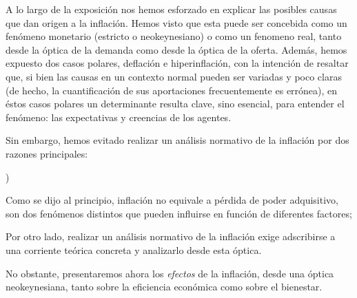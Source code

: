 \documentclass[10pt,a4paper]{article}
\newcounter{alphaitem}
\newenvironment{la}
      {\begin{list}{\alph{alphaitem})}{%
          \usecounter{alphaitem}%
          \setlength{\leftmargin}{1cm}%
          \setlength{\parskip}{3pt}%
          \setlength{\itemsep}{0pt}%
          \setlength{\parsep}{0pt}%
      }}
      {\end{list}}
\begin{document}
A lo largo de la exposición nos hemos esforzado en explicar las posibles causas que dan origen a la inflación. Hemos visto que esta puede ser concebida como un fenómeno monetario (estricto o neokeynesiano) o como un fenomeno real, tanto desde la óptica de la demanda como desde la óptica de la oferta. Además, hemos expuesto dos casos polares, deflación e hiperinflación, con la intención de resaltar que, si bien las causas en un contexto normal pueden ser variadas y poco claras (de hecho, la cuantificación de sus aportaciones frecuentemente es errónea), en éstos casos polares un determinante resulta clave, sino esencial, para entender el fenómeno: las expectativas y creencias de los agentes. 

Sin embargo, hemos evitado realizar un análisis normativo de la inflación por dos razones principales:
\begin{la}
    \item Como se dijo al principio, inflación no equivale a pérdida de poder adquisitivo, son dos fenómenos distintos que pueden influirse en función de diferentes factores;
    \item Por otro lado, realizar un análisis normativo de la inflación exige adscribirse a una corriente teórica concreta y analizarlo desde esta óptica.
\end{la}

No obstante, presentaremos ahora los \textit{efectos} de la inflación, desde una óptica neokeynesiana, tanto sobre la eficiencia económica como sobre el bienestar.
\end{document}
